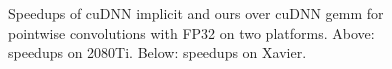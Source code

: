 \begin{figure}
\captionsetup[subfloat]{labelformat=empty,skip=0pt}
	\centering
\vspace{-5mm}
	\vspace{-6mm}
	\caption{Speedups of cuDNN implicit and ours over cuDNN gemm for pointwise convolutions with FP32 on two platforms. Above: speedups on 2080Ti. Below: speedups on Xavier.}
	\label{fig:pwspeedupfp32}
\end{figure}

